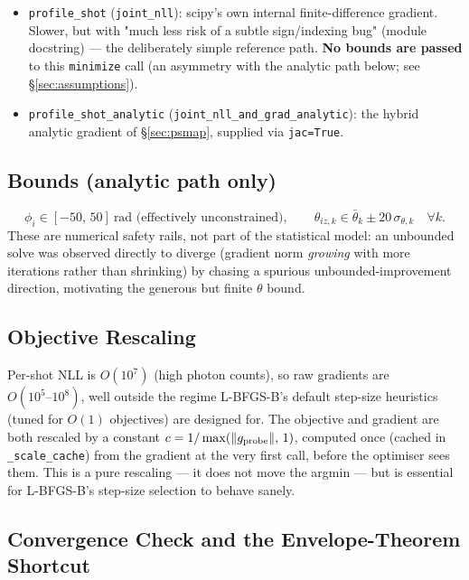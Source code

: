 \documentclass[11pt,a4paper]{article}
\newcommand{\code}[1]{\texttt{#1}}
\begin{document}
\begin{itemize}
  \item \code{profile\_shot} (\code{joint\_nll}): scipy's own internal
    finite-difference gradient. Slower, but with "much less risk of a
    subtle sign/indexing bug" (module docstring) --- the deliberately
    simple reference path. \textbf{No bounds are passed} to this
    \code{minimize} call (an asymmetry with the analytic path below;
    see \S\ref{sec:assumptions}).
  \item \code{profile\_shot\_analytic} (\code{joint\_nll\_and\_grad\_analytic}):
    the hybrid analytic gradient of \S\ref{sec:psmap}, supplied via
    \code{jac=True}.
\end{itemize}

\subsection{Bounds (analytic path only)}

\begin{equation}
  \phi_i \in [-50,\,50]\ \text{rad (effectively unconstrained)},\qquad
  \theta_{iz,k} \in \bar\theta_k \pm 20\,\sigma_{\theta,k}\quad\forall k.
\end{equation}
These are numerical safety rails, not part of the statistical model: an
unbounded solve was observed directly to diverge (gradient norm
\emph{growing} with more iterations rather than shrinking) by chasing a
spurious unbounded-improvement direction, motivating the generous but
finite $\theta$ bound.

\subsection{Objective Rescaling}

Per-shot NLL is $O(10^7)$ (high photon counts), so raw gradients are
$O(10^5\text{--}10^8)$, well outside the regime L-BFGS-B's default
step-size heuristics (tuned for $O(1)$ objectives) are designed for. The
objective and gradient are both rescaled by a constant
$c = 1/\max(\|g_{\rm probe}\|,\,1)$, computed once (cached in
\code{\_scale\_cache}) from the gradient at the very first call, before the
optimiser sees them. This is a pure rescaling --- it does not move the
arg\-min --- but is essential for L-BFGS-B's step-size selection to behave
sanely.

\subsection{Convergence Check and the Envelope-Theorem Shortcut}
\label{sec:envelope}
\end{document}
